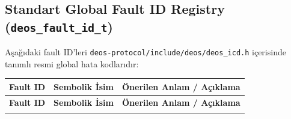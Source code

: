 \documentclass[a4paper,11pt]{article}
\newcommand{\code}[1]{\texttt{#1}}
\begin{document}
\subsection{Standart Global Fault ID Registry (\code{deos\_fault\_id\_t})}

Aşağıdaki fault ID'leri \code{deos-protocol/include/deos/deos\_icd.h} içerisinde tanımlı resmi global hata kodlarıdır:

\begin{center}
\small
\begin{longtable}{c >{\ttfamily\footnotesize}p{7.6cm} p{6.6cm}}
\toprule
\textbf{Fault ID} & \rmfamily\textbf{Sembolik İsim} & \textbf{Önerilen Anlam / Açıklama} \\
\midrule
\endfirsthead
\toprule
\textbf{Fault ID} & \rmfamily\textbf{Sembolik İsim} & \textbf{Önerilen Anlam / Açıklama} \\
\midrule
\endhead
\bottomrule
\endfoot
\bottomrule
\endlastfoot


\end{longtable}
\end{center}
\end{document}
